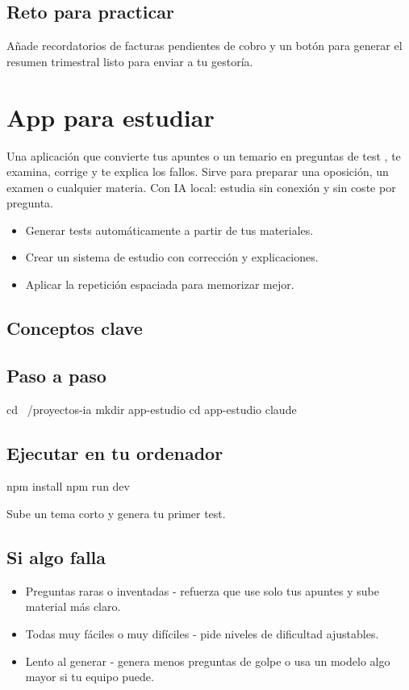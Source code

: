 \documentclass[11pt,a4paper]{book}
\begin{document}
\section{Reto para practicar}
Añade recordatorios de facturas pendientes de cobro y un botón para generar el resumen trimestral listo para enviar a tu gestoría.

\chapter{App para estudiar}
Una aplicación que convierte tus apuntes o un temario en preguntas de test , te examina, corrige y te explica los fallos. Sirve para preparar una oposición, un examen o cualquier materia. Con IA local: estudia sin conexión y sin coste por pregunta.

\begin{itemize}\item Generar tests automáticamente a partir de tus materiales.\end{itemize}
\begin{itemize}\item Crear un sistema de estudio con corrección y explicaciones.\end{itemize}
\begin{itemize}\item Aplicar la repetición espaciada para memorizar mejor.\end{itemize}
\section{Conceptos clave}
\section{Paso a paso}
\begin{codebox}
cd ~/proyectos-ia
mkdir app-estudio
cd app-estudio
claude
\end{codebox}
\section{Ejecutar en tu ordenador}
\begin{codebox}
npm install
npm run dev
\end{codebox}
Sube un tema corto y genera tu primer test.

\section{Si algo falla}
\begin{itemize}\item Preguntas raras o inventadas - refuerza que use solo tus apuntes y sube material más claro.\end{itemize}
\begin{itemize}\item Todas muy fáciles o muy difíciles - pide niveles de dificultad ajustables.\end{itemize}
\begin{itemize}\item Lento al generar - genera menos preguntas de golpe o usa un modelo algo mayor si tu equipo puede.\end{itemize}
\end{document}
